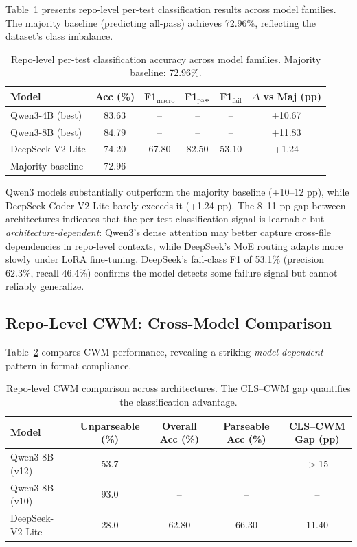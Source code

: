 \documentclass[11pt]{article}
\begin{document}
Table~\ref{tab:repo_cls} presents repo-level per-test classification results across model families. The majority baseline (predicting all-pass) achieves 72.96\%, reflecting the dataset's class imbalance.

\begin{table}[t]
\centering
\caption{Repo-level per-test classification accuracy across model families. Majority baseline: 72.96\%.}
\label{tab:repo_cls}
\begin{tabular}{lccccc}
\toprule
Model & Acc (\%) & F1$_{\text{macro}}$ & F1$_{\text{pass}}$ & F1$_{\text{fail}}$ & $\Delta$ vs Maj (pp) \\
\midrule
Qwen3-4B (best) & 83.63 & -- & -- & -- & +10.67 \\
Qwen3-8B (best) & 84.79 & -- & -- & -- & +11.83 \\
DeepSeek-V2-Lite & 74.20 & 67.80 & 82.50 & 53.10 & +1.24 \\
\midrule
Majority baseline & 72.96 & -- & -- & -- & -- \\
\bottomrule
\end{tabular}
\end{table}

Qwen3 models substantially outperform the majority baseline (+10--12 pp), while DeepSeek-Coder-V2-Lite barely exceeds it (+1.24 pp). The 8--11 pp gap between architectures indicates that the per-test classification signal is learnable but \emph{architecture-dependent}: Qwen3's dense attention may better capture cross-file dependencies in repo-level contexts, while DeepSeek's MoE routing adapts more slowly under LoRA fine-tuning. DeepSeek's fail-class F1 of 53.1\% (precision 62.3\%, recall 46.4\%) confirms the model detects some failure signal but cannot reliably generalize.

\subsection{Repo-Level CWM: Cross-Model Comparison}
\label{sec:repo-cwm}

Table~\ref{tab:repo_cwm} compares CWM performance, revealing a striking \emph{model-dependent} pattern in format compliance.

\begin{table}[t]
\centering
\caption{Repo-level CWM comparison across architectures. The CLS--CWM gap quantifies the classification advantage.}
\label{tab:repo_cwm}
\begin{tabular}{lcccc}
\toprule
Model & Unparseable (\%) & Overall Acc (\%) & Parseable Acc (\%) & CLS--CWM Gap (pp) \\
\midrule
Qwen3-8B (v12) & 53.7 & -- & -- & $>$15 \\
Qwen3-8B (v10) & 93.0 & -- & -- & -- \\
DeepSeek-V2-Lite & 28.0 & 62.80 & 66.30 & 11.40 \\
\bottomrule
\end{tabular}
\end{table}
\end{document}
